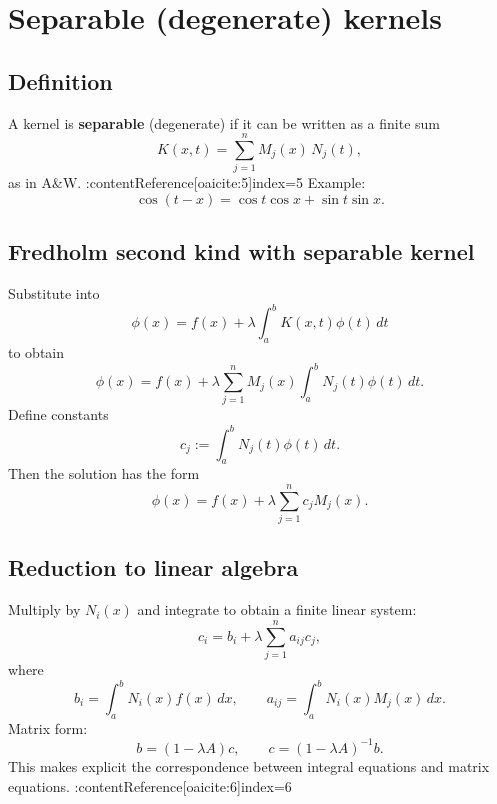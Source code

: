 
\section{Separable (degenerate) kernels}

\subsection{Definition}
A kernel is \textbf{separable} (degenerate) if it can be written as a finite sum
\begin{equation}
K(x,t)=\sum_{j=1}^n M_j(x)\,N_j(t),
\end{equation}
as in A\&W. :contentReference[oaicite:5]{index=5}
Example:
\begin{equation}
\cos(t-x)=\cos t\cos x+\sin t\sin x.
\end{equation}

\subsection{Fredholm second kind with separable kernel}
Substitute into
\begin{equation}
\phi(x)=f(x)+\lambda\int_a^b K(x,t)\phi(t)\,dt
\end{equation}
to obtain
\begin{equation}
\phi(x)=f(x)+\lambda\sum_{j=1}^n M_j(x)\int_a^b N_j(t)\phi(t)\,dt.
\end{equation}
Define constants
\begin{equation}
c_j:=\int_a^b N_j(t)\phi(t)\,dt.
\end{equation}
Then the solution has the form
\begin{equation}
\phi(x)=f(x)+\lambda\sum_{j=1}^n c_j M_j(x).
\end{equation}

\subsection{Reduction to linear algebra}
Multiply by $N_i(x)$ and integrate to obtain a finite linear system:
\begin{equation}
c_i=b_i+\lambda\sum_{j=1}^n a_{ij}c_j,
\end{equation}
where
\begin{equation}
b_i=\int_a^b N_i(x)f(x)\,dx,
\qquad
a_{ij}=\int_a^b N_i(x)M_j(x)\,dx.
\end{equation}
Matrix form:
\begin{equation}
b=(1-\lambda A)c,
\qquad
c=(1-\lambda A)^{-1}b.
\end{equation}
This makes explicit the correspondence between integral equations and matrix equations. :contentReference[oaicite:6]{index=6}

